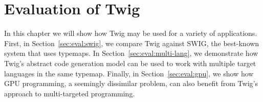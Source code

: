 
\chapter{Evaluation of Twig}
\label{ch:eval}

In this chapter we will show how Twig may be used for a variety of
applications. First, in Section~\ref{sec:eval:swig}, we compare
Twig against SWIG, the best-known system that uses typemaps. In
Section~\ref{sec:eval:multi-lang}, we demonstrate how Twig's
abstract code generation model can be used to work with multiple
target languages in the same typemap. Finally, in
Section~\ref{sec:eval:gpu}, we show how GPU programming, a
seemingly dissimilar problem, can also benefit from Twig's
approach to multi-targeted programming.




